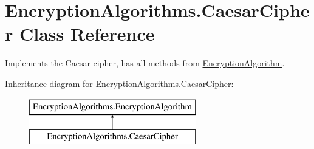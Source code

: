 \hypertarget{classEncryptionAlgorithms_1_1CaesarCipher}{}\section{Encryption\+Algorithms.\+Caesar\+Cipher Class Reference}
\label{classEncryptionAlgorithms_1_1CaesarCipher}


Implements the Caesar cipher, has all methods from \mbox{\hyperlink{classEncryptionAlgorithms_1_1EncryptionAlgorithm}{Encryption\+Algorithm}}.  


Inheritance diagram for Encryption\+Algorithms.\+Caesar\+Cipher\+:\begin{figure}[H]
\begin{center}
\leavevmode
\includegraphics[height=2.000000cm]{classEncryptionAlgorithms_1_1CaesarCipher}
\end{center}
\end{figure}
